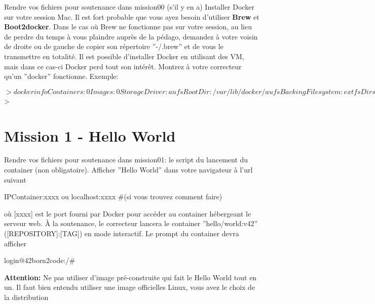 \documentclass{42}
\begin{document}
Rendre vos fichiers pour soutenance dans mission00 (s’il y en a)
\newline
\newline
Installer Docker sur votre session Mac. Il est fort probable que vous ayez besoin d’utiliser \textbf{Brew} et \textbf{Boot2docker}.
\newline
\newline
Dans le cas où Brew ne fonctionne pas sur votre session, au lieu de perdre du temps à vous plaindre auprès de la pédago, demandez à votre voisin de droite ou de gauche de copier son répertoire ''-/.brew'' et de vous le transmettre en totalité.
\newline
\newline
Il est possible d’installer Docker en utilisant des VM, mais dans ce cas-ci Docker perd tout son intérêt.
\newline
\newline
Montrez à votre correcteur qu’un ''docker'' fonctionne.
\newline
\newline
Exemple:
\begin{42console}
$> docker info
Containers: 0
Images: 0
Storage Driver: aufs
 Root Dir: /var/lib/docker/aufs
 Backing Filesystem: extfs
 Dirs: 0
Execution Driver: native-0.2
Kernel Version: 3.16.0-30-generic
Operating System: Ubuntu 14.10
CPUs: 2
Total Memory: 3.633 GiB
Name: ubuntu
ID: PDDP:L64U:RQBT:G5ET:TEAC:XIJK:7JMR:ZVJW:NWU3:JMMD:YV36:WRUM
WARNING: No swap limit support
$>
\end{42console}

	\newpage

\section{Mission 1 - Hello World}

Rendre vos fichiers pour soutenance dans mission01: le script du lancement du container (non obligatoire).
\newline
\newline
Afficher ''Hello World'' dans votre navigateur à l’url suivant
\begin{42console}
IPContainer:xxxx ou localhost:xxxx #(si vous trouvez comment faire)
\end{42console}
où [xxxx] est le port fourni par Docker pour accéder au container hébergeant le serveur web.
\newline
\newline
À la soutenance, le correcteur lancera le container ''hello/world:v42'' ([REPOSITORY]:[TAG]) en mode interactif. Le prompt du container devra afficher
\begin{42console}
login@42born2code:/#
\end{42console}
\warn
{
\textbf{Attention:}
\newline
Ne pas utiliser d'image pré-construite qui fait le Hello World tout en un.
\newline
Il faut bien entendu utiliser une image officielles Linux, vous avez le choix de la distribution
}
	\newpage
\end{document}
